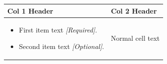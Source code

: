 \documentclass[11pt,a4paper]{article}
\begin{document}
\begin{table}[h]
\begin{tabular}{|l|l|}
\hline
Col 1 Header & Col 2 Header \\ \hline
\begin{itemize} \item First item text \textit{[Required]}. \item Second item text \textit{[Optional]}. \end{itemize} & Normal cell text \\ \hline
\end{tabular}
\end{table}
\end{document}
